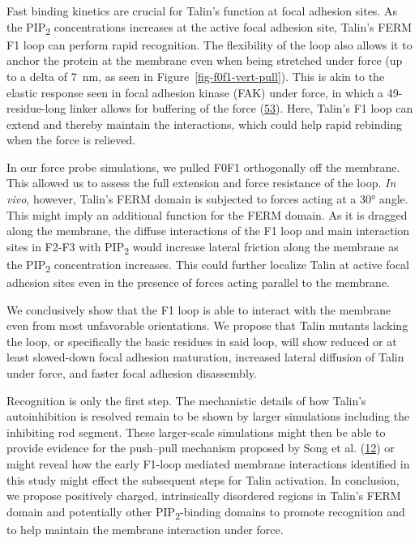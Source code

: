 \documentclass[
  twocolumn]{biophys-new-mod}
\begin{document}
Fast binding kinetics are crucial for Talin's function at focal adhesion
sites. As the PIP\textsubscript{2} concentrations increases at the
active focal adhesion site, Talin's FERM F1 loop can perform rapid
recognition. The flexibility of the loop also allows it to anchor the
protein at the membrane even when being stretched under force (up to a
delta of 7~nm, as seen in Figure~\ref{fig-f0f1-vert-pull}). This is akin
to the elastic response seen in focal adhesion kinase (FAK) under force,
in which a 49-residue-long linker allows for buffering of the force
(\protect\hyperlink{ref-bauerStructuralMechanisticInsights2019}{53}).
Here, Talin's F1 loop can extend and thereby maintain the interactions,
which could help rapid rebinding when the force is relieved.

In our force probe simulations, we pulled F0F1 orthogonally off the
membrane. This allowed us to assess the full extension and force
resistance of the loop. \emph{In vivo}, however, Talin's FERM domain is
subjected to forces acting at a 30° angle. This might imply an
additional function for the FERM domain. As it is dragged along the
membrane, the diffuse interactions of the F1 loop and main interaction
sites in F2-F3 with PIP\textsubscript{2} would increase lateral friction
along the membrane as the PIP\textsubscript{2} concentration increases.
This could further localize Talin at active focal adhesion sites even in
the presence of forces acting parallel to the membrane.

We conclusively show that the F1 loop is able to interact with the
membrane even from most unfavorable orientations. We propose that Talin
mutants lacking the loop, or specifically the basic residues in said
loop, will show reduced or at least slowed-down focal adhesion
maturation, increased lateral diffusion of Talin under force, and faster
focal adhesion disassembly.

Recognition is only the first step. The mechanistic details of how
Talin's autoinhibition is resolved remain to be shown by larger
simulations including the inhibiting rod segment. These larger-scale
simulations might then be able to provide evidence for the push--pull
mechanism proposed by Song et al.
(\protect\hyperlink{ref-songNovelMembranedependentSwitch2012a}{12}) or
might reveal how the early F1-loop mediated membrane interactions
identified in this study might effect the subsequent steps for Talin
activation. In conclusion, we propose positively charged, intrinsically
disordered regions in Talin's FERM domain and potentially other
PIP\textsubscript{2}-binding domains to promote recognition and to help
maintain the membrane interaction under force.
\end{document}
